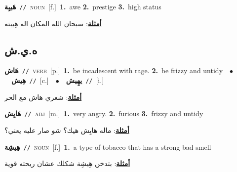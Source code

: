 \documentclass[10pt,a4paper,twoside]{article} %
\begin{document}
\begin{multicols}{2}
{\setlength\topsep{0pt}\textbf{\foreignlanguage{arabic}{هَيبِة}}\ {\color{gray}\texttt{//}\color{black}}\ \textsc{noun}\ [f.]\ \textbf{1.}~awe  \textbf{2.}~prestige  \textbf{3.}~high status\  \begin{flushright}\color{gray}\foreignlanguage{arabic}{\textbf{\underline{\foreignlanguage{arabic}{أمثلة}}}: سبحان الله المكان اله هِيبته}\end{flushright}\color{black}} \vspace{2mm}

\vspace{-3mm}
\subsection*{\color{blue}\foreignlanguage{arabic}{ه.ي.ش}\color{blue}{}} 

{\setlength\topsep{0pt}\textbf{\foreignlanguage{arabic}{هَاش}}\ {\color{gray}\texttt{//}\color{black}}\ \textsc{verb}\ [p.]\ \textbf{1.}~be incadescent with rage.  \textbf{2.}~be frizzy and untidy\ \ $\bullet$\ \ \setlength\topsep{0pt}\textbf{\foreignlanguage{arabic}{هِيش}}\ {\color{gray}\texttt{//}\color{black}}\ [c.]\ \ $\bullet$\ \ \setlength\topsep{0pt}\textbf{\foreignlanguage{arabic}{يهِيش}}\ {\color{gray}\texttt{//}\color{black}}\ [i.]\  \begin{flushright}\color{gray}\foreignlanguage{arabic}{\textbf{\underline{\foreignlanguage{arabic}{أمثلة}}}: شعري هاش مع الحر}\end{flushright}\color{black}} \vspace{2mm}

{\setlength\topsep{0pt}\textbf{\foreignlanguage{arabic}{هَايِش}}\ {\color{gray}\texttt{//}\color{black}}\ \textsc{adj}\ [m.]\ \textbf{1.}~very angry.  \textbf{2.}~furious  \textbf{3.}~frizzy and untidy\  \begin{flushright}\color{gray}\foreignlanguage{arabic}{\textbf{\underline{\foreignlanguage{arabic}{أمثلة}}}: ماله هايِش هيك؟ شو صار عليه يعني؟}\end{flushright}\color{black}} \vspace{2mm}

{\setlength\topsep{0pt}\textbf{\foreignlanguage{arabic}{هِيشِة}}\ {\color{gray}\texttt{//}\color{black}}\ \textsc{noun}\ [f.]\ \textbf{1.}~a type of tobacco that has a strong bad smell\  \begin{flushright}\color{gray}\foreignlanguage{arabic}{\textbf{\underline{\foreignlanguage{arabic}{أمثلة}}}: بتدخن هِيشِة شكلك عشان ريحته قوية}\end{flushright}\color{black}} \vspace{2mm}


\end{multicols}
\end{document}
